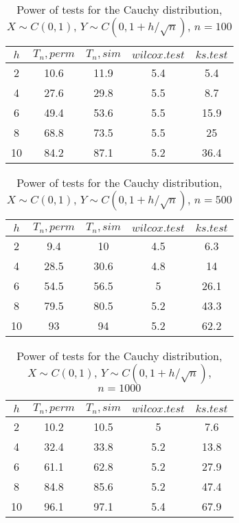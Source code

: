 \documentclass{svproc}
\begin{document}
\begin{table}
  \caption{Power of tests for the Cauchy distribution, $X\sim C(0,1)$, $Y\sim C(0, 1 + h/\sqrt{n})$, $n=100$}
  \begin{center}
  \begin{tabular}{c@{\quad}c@{\quad}c@{\quad}c@{\quad}c}
  \hline
  $h$ & $T_n, perm$ & $T_n, sim$ & $wilcox.test$ & $ks.test$ \\
  \hline
  2 & 10.6 & 11.9 & 5.4 & 5.4 \\
  4 & 27.6 & 29.8 & 5.5 & 8.7 \\
  6 & 49.4 & 53.6 & 5.5 & 15.9 \\
  8 & 68.8 & 73.5 & 5.5 & 25 \\
  10 & 84.2 & 87.1 & 5.2 & 36.4 \\
  \hline
  \end{tabular}
  \end{center}
\end{table}

\begin{table}
  \caption{Power of tests for the Cauchy distribution, $X\sim C(0,1)$, $Y\sim C(0, 1 + h/\sqrt{n})$, $n=500$}
  \begin{center}
  \begin{tabular}{c@{\quad}c@{\quad}c@{\quad}c@{\quad}c}
  \hline
  $h$ & $T_n, perm$ & $T_n, sim$ & $wilcox.test$ & $ks.test$ \\
  \hline
  2 & 9.4 & 10 & 4.5 & 6.3 \\
  4 & 28.5 & 30.6 & 4.8 & 14 \\
  6 & 54.5 & 56.5 & 5 & 26.1 \\
  8 & 79.5 & 80.5 & 5.2 & 43.3 \\
  10 & 93 & 94 & 5.2 & 62.2 \\
  \hline
  \end{tabular}
  \end{center}
\end{table}

\begin{table}
  \caption{Power of tests for the Cauchy distribution, $X\sim C(0,1)$, $Y\sim C(0, 1 + h/\sqrt{n})$, $n=1000$}
  \begin{center}
  \begin{tabular}{c@{\quad}c@{\quad}c@{\quad}c@{\quad}c}
  $h$ & $T_n, perm$ & $T_n, sim$ & $wilcox.test$ & $ks.test$ \\
  \hline
  2 & 10.2 & 10.5 & 5 & 7.6 \\
  4 & 32.4 & 33.8 & 5.2 & 13.8 \\
  6 & 61.1 & 62.8 & 5.2 & 27.9 \\
  8 & 84.8 & 85.6 & 5.2 & 47.4 \\
  10 & 96.1 & 97.1 & 5.4 & 67.9 \\
  \hline
  \end{tabular}
  \end{center}
\end{table}
\end{document}
